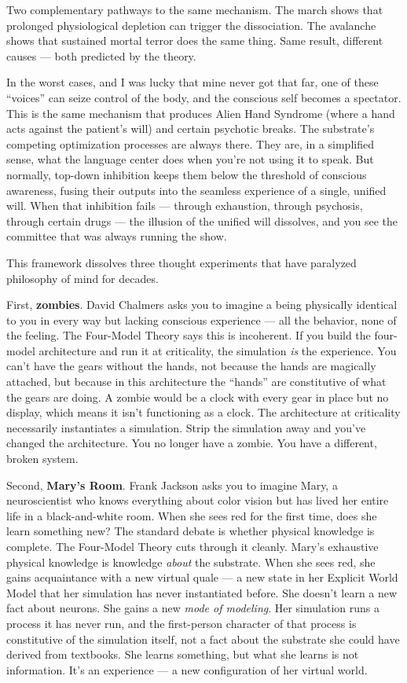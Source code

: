 \documentclass[11pt, twoside, openright]{book}
\begin{document}
Two complementary pathways to the same mechanism. The march shows that prolonged physiological depletion can trigger the dissociation. The avalanche shows that sustained mortal terror does the same thing. Same result, different causes --- both predicted by the theory.

In the worst cases, and I was lucky that mine never got that far, one of these ``voices'' can seize control of the body, and the conscious self becomes a spectator. This is the same mechanism that produces Alien Hand Syndrome (where a hand acts against the patient's will) and certain psychotic breaks. The substrate's competing optimization processes are always there. They are, in a simplified sense, what the language center does when you're not using it to speak. But normally, top-down inhibition keeps them below the threshold of conscious awareness, fusing their outputs into the seamless experience of a single, unified will. When that inhibition fails --- through exhaustion, through psychosis, through certain drugs --- the illusion of the unified will dissolves, and you see the committee that was always running the show.

This framework dissolves three thought experiments that have paralyzed philosophy of mind for decades.

First, \textbf{zombies}. David Chalmers asks you to imagine a being physically identical to you in every way but lacking conscious experience --- all the behavior, none of the feeling. The Four-Model Theory says this is incoherent. If you build the four-model architecture and run it at criticality, the simulation \textit{is} the experience. You can't have the gears without the hands, not because the hands are magically attached, but because in this architecture the ``hands'' are constitutive of what the gears are doing. A zombie would be a clock with every gear in place but no display, which means it isn't functioning as a clock. The architecture at criticality necessarily instantiates a simulation. Strip the simulation away and you've changed the architecture. You no longer have a zombie. You have a different, broken system.

Second, \textbf{Mary's Room}. Frank Jackson asks you to imagine Mary, a neuroscientist who knows everything about color vision but has lived her entire life in a black-and-white room. When she sees red for the first time, does she learn something new? The standard debate is whether physical knowledge is complete. The Four-Model Theory cuts through it cleanly. Mary's exhaustive physical knowledge is knowledge \textit{about} the substrate. When she sees red, she gains acquaintance with a new virtual quale --- a new state in her Explicit World Model that her simulation has never instantiated before. She doesn't learn a new fact about neurons. She gains a new \textit{mode of modeling}. Her simulation runs a process it has never run, and the first-person character of that process is constitutive of the simulation itself, not a fact about the substrate she could have derived from textbooks. She learns something, but what she learns is not information. It's an experience --- a new configuration of her virtual world.
\end{document}
